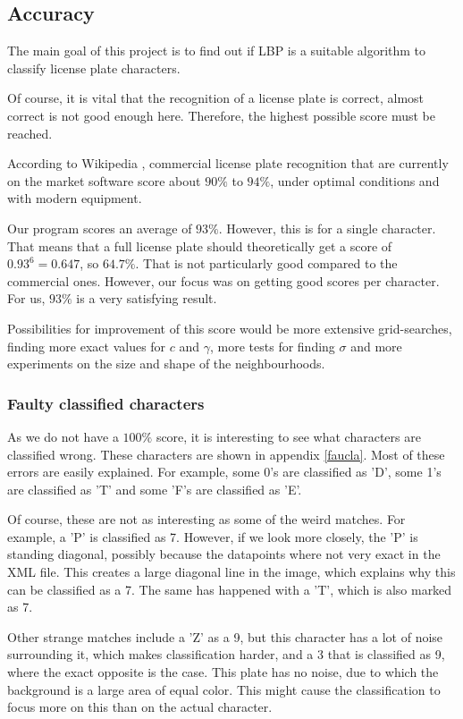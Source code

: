 \documentclass[a4paper]{article}
\begin{document}
\subsection{Accuracy}

The main goal of this project is to find out if LBP is a suitable algorithm to
classify license plate characters.

Of course, it is vital that the recognition of a license plate is correct,
almost correct is not good enough here. Therefore, the highest possible score
must be reached.

According to Wikipedia \cite{wikiplate}, commercial license plate recognition
that are currently on the market software score about $90\%$ to $94\%$, under
optimal conditions and with modern equipment.

Our program scores an average of $93\%$. However, this is for a single
character. That means that a full license plate should theoretically
get a score of $0.93^6 = 0.647$, so $64.7\%$. That is not particularly
good compared to the commercial ones. However, our focus was on getting
good scores per character. For us, $93\%$ is a very satisfying result.

Possibilities for improvement of this score would be more extensive
grid-searches, finding more exact values for $c$ and $\gamma$, more tests
for finding $\sigma$ and more experiments on the size and shape of the
neighbourhoods.

\subsubsection*{Faulty classified characters}

As we do not have a $100\%$ score, it is interesting to see what characters are
classified wrong. These characters are shown in appendix \ref{faucla}. Most of
these errors are easily explained. For example, some 0's are classified as
'D', some 1's are classified as 'T' and some 'F's are classified as 'E'.

Of course, these are not as interesting as some of the weird matches. For
example, a 'P' is classified as 7. However, if we look more closely, the 'P' is
standing diagonal, possibly because the datapoints where not very exact in the
XML file. This creates a large diagonal line in the image, which explains why
this can be classified as a 7. The same has happened with a 'T', which is also
marked as 7.

Other strange matches include a 'Z' as a 9, but this character has a lot of
noise surrounding it, which makes classification harder, and a 3 that is
classified as 9, where the exact opposite is the case. This plate has no noise,
due to which the background is a large area of equal color. This might cause
the classification to focus more on this than on the actual character.
\end{document}
